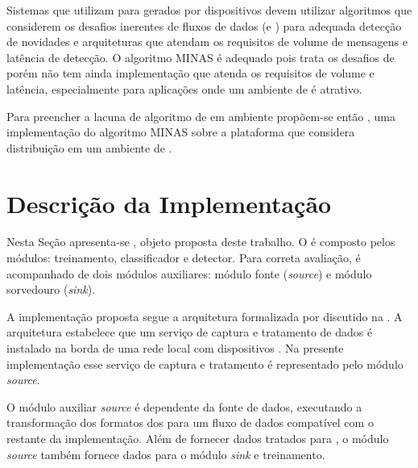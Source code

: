 Sistemas que utilizam \nd para \streams gerados por dispositivos \iot devem
utilizar algoritmos que considerem os desafios inerentes de fluxos de dados
(\evolution e \drift) para adequada detecção de novidades e arquiteturas
que atendam os requisitos de volume de mensagens e latência de detecção.
O algoritmo MINAS é adequado pois trata os desafios de \streamMining porém não
tem ainda implementação que atenda os requisitos de volume e latência,
especialmente para aplicações \iot onde um ambiente de \fog é atrativo.

Para preencher a lacuna de algoritmo de \nd em ambiente \fog propõem-se então
\mfog, uma implementação do algoritmo MINAS sobre a plataforma \flink que
considera distribuição em um ambiente de \fog.


\section{Descrição da Implementação}\label{sec:descricao}

\newcommand{\source}{\emph{source}\xspace}
\newcommand{\sink}{\emph{sink}\xspace}

\newcommand{\offline}{treinamento\xspace}
\newcommand{\classify}{classificador\xspace}
\newcommand{\detector}{detector\xspace}

Nesta Seção apresenta-se \mfog, objeto proposta deste trabalho.
O \mfog é composto pelos módulos: \offline, \classify e \detector.
Para correta avaliação, \mfog é acompanhado de dois módulos auxiliares:
módulo fonte (\source) e módulo sorvedouro (\sink).



A implementação proposta segue a arquitetura \idsiot formalizada por
 discutido na .
A arquitetura \idsiot estabelece que um serviço de captura e tratamento de dados
é instalado na borda de uma rede local com dispositivos \iot.
Na presente implementação
esse serviço de captura e tratamento é representado pelo módulo \source.

O módulo auxiliar \source é dependente da fonte de dados, executando a transformação dos
formatos dos \datasets para um fluxo de dados compatível com o restante da
implementação.
Além de fornecer dados tratados para \mfog, o módulo \source também fornece
dados para o módulo \sink e \offline.

